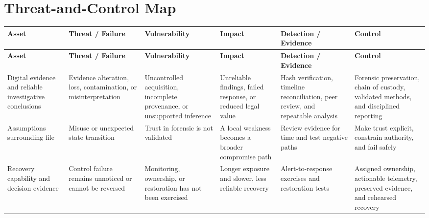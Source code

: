 \documentclass[11pt]{article}
\begin{document}
\section*{Threat-and-Control Map}
\begingroup\scriptsize\setlength{\tabcolsep}{2pt}
\begin{longtable}{>{\RaggedRight\arraybackslash}p{}>{\RaggedRight\arraybackslash}p{}>{\RaggedRight\arraybackslash}p{}>{\RaggedRight\arraybackslash}p{}>{\RaggedRight\arraybackslash}p{}>{\RaggedRight\arraybackslash}p{}}
\toprule\rowcolor{Navy}\color{white}\textbf{Asset} & \color{white}\textbf{Threat / Failure} & \color{white}\textbf{Vulnerability} & \color{white}\textbf{Impact} & \color{white}\textbf{Detection / Evidence} & \color{white}\textbf{Control}\\\midrule
\endfirsthead
\toprule\rowcolor{Navy}\color{white}\textbf{Asset} & \color{white}\textbf{Threat / Failure} & \color{white}\textbf{Vulnerability} & \color{white}\textbf{Impact} & \color{white}\textbf{Detection / Evidence} & \color{white}\textbf{Control}\\\midrule
\endhead
Digital evidence and reliable investigative conclusions & Evidence alteration, loss, contamination, or misinterpretation & Uncontrolled acquisition, incomplete provenance, or unsupported inference & Unreliable findings, failed response, or reduced legal value & Hash verification, timeline reconciliation, peer review, and repeatable analysis & Forensic preservation, chain of custody, validated methods, and disciplined reporting\\\midrule
Assumptions surrounding file & Misuse or unexpected state transition & Trust in forensic is not validated & A local weakness becomes a broader compromise path & Review evidence for time and test negative paths & Make trust explicit, constrain authority, and fail safely\\\midrule
Recovery capability and decision evidence & Control failure remains unnoticed or cannot be reversed & Monitoring, ownership, or restoration has not been exercised & Longer exposure and slower, less reliable recovery & Alert-to-response exercises and restoration tests & Assigned ownership, actionable telemetry, preserved evidence, and rehearsed recovery\\\midrule
\bottomrule
\end{longtable}
\endgroup
\end{document}
